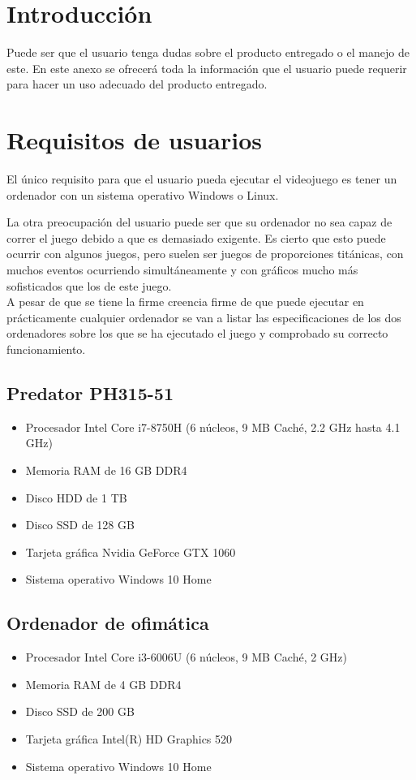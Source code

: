 
\section{Introducción}
Puede ser que el usuario tenga dudas sobre el producto entregado o el manejo de este. En este anexo se ofrecerá toda la información que el usuario puede requerir para hacer un uso adecuado del producto entregado.

\section{Requisitos de usuarios}
El único requisito para que el usuario pueda ejecutar el videojuego es tener un ordenador con un sistema operativo Windows o Linux.

La otra preocupación del usuario puede ser que su ordenador no sea capaz de correr el juego debido a que es demasiado exigente. Es cierto que esto puede ocurrir con algunos juegos, pero suelen ser juegos de proporciones titánicas, con muchos eventos ocurriendo simultáneamente y con gráficos mucho más sofisticados que los de este juego.\\
A pesar de que se tiene la firme creencia firme de que puede ejecutar en prácticamente cualquier ordenador se van a listar las especificaciones de los dos ordenadores sobre los que se ha ejecutado el juego y comprobado su correcto funcionamiento.

\subsection{Predator PH315-51}
\begin{itemize}
\item
Procesador Intel Core i7-8750H (6 núcleos, 9 MB Caché, 2.2 GHz hasta 4.1 GHz)
\item
Memoria RAM de 16 GB DDR4
\item
Disco HDD de 1 TB
\item
Disco SSD de 128 GB
\item
Tarjeta gráfica Nvidia GeForce GTX 1060
\item
Sistema operativo Windows 10 Home
\end{itemize}

\subsection{Ordenador de ofimática}
\begin{itemize}
\item
Procesador Intel Core i3-6006U (6 núcleos, 9 MB Caché, 2 GHz)
\item
Memoria RAM de 4 GB DDR4
\item
Disco SSD de 200 GB
\item
Tarjeta gráfica Intel(R) HD Graphics 520
\item
Sistema operativo Windows 10 Home
\end{itemize}

